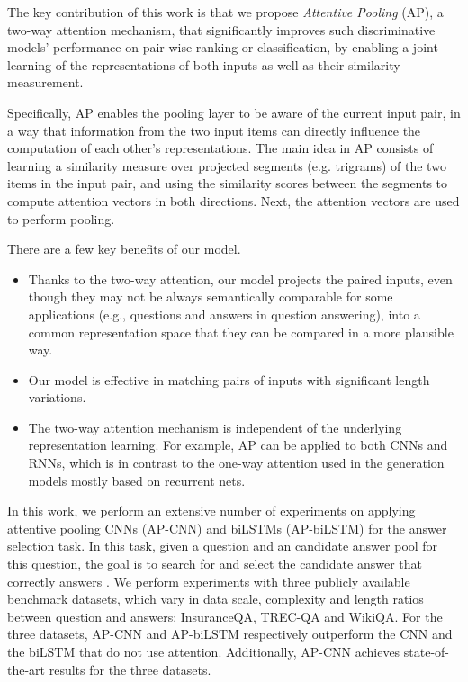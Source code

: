 \documentclass{article}
\begin{document}
The key contribution of this work is that we propose \emph{Attentive Pooling} (AP),
a two-way attention mechanism, that significantly improves such discriminative models' performance on 
pair-wise ranking or classification, by enabling a joint learning of the representations of both inputs 
as well as their similarity measurement.

Specifically, AP enables the pooling layer to be aware of the current input pair, 
in a way that information from the two input items can directly influence the computation of each other's representations.
The main idea in AP consists of learning a similarity measure over projected segments (e.g. trigrams) of the two items in the input pair,
and using the similarity scores between the segments to compute attention vectors in both directions. 
Next,
the attention vectors are used to perform pooling.


There are a few key benefits of our model.
\begin{itemize}
\item Thanks to the two-way attention, our model projects the paired inputs, even though they may not be always semantically comparable for some applications (e.g., questions and answers in question answering), into a common representation space that they can be compared in a more plausible way.
\item Our model is effective in matching pairs of inputs with significant length variations.
\item The two-way attention mechanism is independent of the underlying representation learning. For example, AP can be applied to both CNNs and RNNs, which is in contrast to the one-way attention used in the generation models mostly based on recurrent nets.
\end{itemize}














In this work,
we perform an extensive number of experiments on applying attentive pooling CNNs (AP-CNN) and biLSTMs (AP-biLSTM) for the answer selection task.
In this task,
given a question  and an candidate answer pool  for this question, 
the goal is to search for and select the candidate answer  that correctly answers .
We perform experiments with three publicly available benchmark datasets, which vary in data scale, complexity and length ratios between question and answers: InsuranceQA, TREC-QA and WikiQA.
For the three datasets,
AP-CNN and AP-biLSTM respectively outperform the CNN and the biLSTM that do not use attention.
Additionally,
AP-CNN achieves state-of-the-art results for the three datasets.
\end{document}
